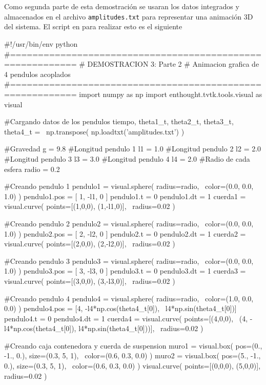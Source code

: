 \

\

Como segunda parte de esta demostración se usaran los datos integrados 
y almacenados en el archivo \texttt{amplitudes.txt} para representar una 
animación 3D del sistema. El script en \python para realizar esto es el 
siguiente


\begin{listing}[style=python]
#!/usr/bin/env python
#==========================================================
# DEMOSTRACION 3: Parte 2
# Animacion grafica de 4 pendulos acoplados
#==========================================================
import numpy as np
import enthought.tvtk.tools.visual as visual

#Cargando datos de los pendulos
tiempo, theta1_t, theta2_t, theta3_t, theta4_t = \
np.transpose( np.loadtxt('amplitudes.txt') )

#Gravedad
g = 9.8
#Longitud pendulo 1
l1 = 1.0
#Longitud pendulo 2
l2 = 2.0
#Longitud pendulo 3
l3 = 3.0
#Longitud pendulo 4
l4 = 2.0
#Radio de cada esfera
radio = 0.2

#Creando pendulo 1
pendulo1 = visual.sphere( radius=radio, \
color=(0.0, 0.0, 1.0) )
pendulo1.pos = [ 1, -l1, 0 ]
pendulo1.t = 0
pendulo1.dt = 1
cuerda1 = visual.curve( points=[(1,0,0), (1,-l1,0)], \
radius=0.02 )

#Creando pendulo 2
pendulo2 = visual.sphere( radius=radio, \
color=(0.0, 0.0, 1.0) )
pendulo2.pos = [ 2, -l2, 0 ]
pendulo2.t = 0
pendulo2.dt = 1
cuerda2 = visual.curve( points=[(2,0,0), (2,-l2,0)], \
radius=0.02 )

#Creando pendulo 3
pendulo3 = visual.sphere( radius=radio, \
color=(0.0, 0.0, 1.0) )
pendulo3.pos = [ 3, -l3, 0 ]
pendulo3.t = 0
pendulo3.dt = 1
cuerda3 = visual.curve( points=[(3,0,0), (3,-l3,0)], \
radius=0.02 )

#Creando pendulo 4
pendulo4 = visual.sphere( radius=radio, \
color=(1.0, 0.0, 0.0) )
pendulo4.pos = [4, -l4*np.cos(theta4_t[0]), \
l4*np.sin(theta4_t[0])]
pendulo4.t = 0
pendulo4.dt = 1
cuerda4 = visual.curve( points=[(4,0,0), \
(4, -l4*np.cos(theta4_t[0]), l4*np.sin(theta4_t[0]))], \
radius=0.02 )

#Creando caja contenedora y cuerda de suspension
muro1 = visual.box( pos=(0., -1., 0.), size=(0.3, 5, 1), \
color=(0.6, 0.3, 0.0) )
muro2 = visual.box( pos=(5., -1., 0.), size=(0.3, 5, 1), \
color=(0.6, 0.3, 0.0) )
visual.curve( points=[(0,0,0), (5,0,0)], radius=0.02 )


\end{listing}
